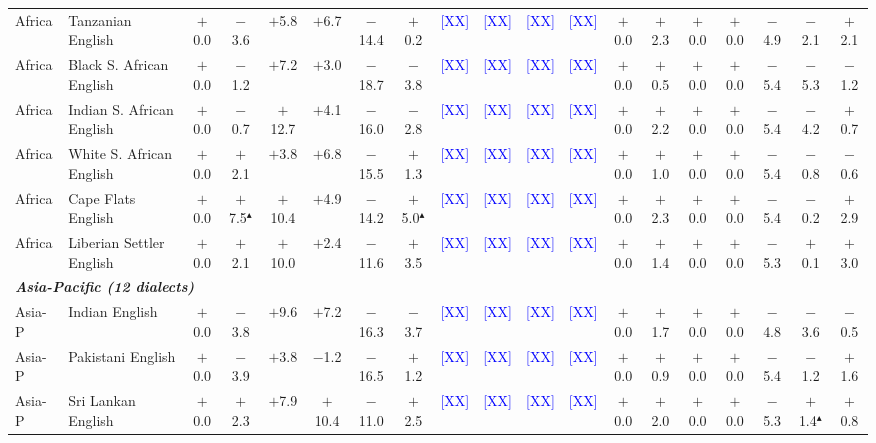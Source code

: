 \begin{table}[t]
\begin{tabular}{llccccccccccccccccc}
Africa & Tanzanian English & $+$0.0 & $-$3.6 & $+$5.8 & $+$6.7 & $-$14.4 & $+$0.2 & \textcolor{blue}{[XX]} & \textcolor{blue}{[XX]} & \textcolor{blue}{[XX]} & \textcolor{blue}{[XX]} & $+$0.0 & $+$2.3 & $+$0.0 & $+$0.0 & $-$4.9 & $-$2.1 & $+$2.1 \\
Africa & Black S. African English & $+$0.0 & $-$1.2 & $+$7.2 & $+$3.0 & $-$18.7 & $-$3.8 & \textcolor{blue}{[XX]} & \textcolor{blue}{[XX]} & \textcolor{blue}{[XX]} & \textcolor{blue}{[XX]} & $+$0.0 & $+$0.5 & $+$0.0 & $+$0.0 & $-$5.4 & $-$5.3 & $-$1.2 \\
Africa & Indian S. African English & $+$0.0 & $-$0.7 & $+$12.7 & $+$4.1 & $-$16.0 & $-$2.8 & \textcolor{blue}{[XX]} & \textcolor{blue}{[XX]} & \textcolor{blue}{[XX]} & \textcolor{blue}{[XX]} & $+$0.0 & $+$2.2 & $+$0.0 & $+$0.0 & $-$5.4 & $-$4.2 & $+$0.7 \\
Africa & White S. African English & $+$0.0 & $+$2.1 & $+$3.8 & $+$6.8 & $-$15.5 & $+$1.3 & \textcolor{blue}{[XX]} & \textcolor{blue}{[XX]} & \textcolor{blue}{[XX]} & \textcolor{blue}{[XX]} & $+$0.0 & $+$1.0 & $+$0.0 & $+$0.0 & $-$5.4 & $-$0.8 & $-$0.6 \\
Africa & Cape Flats English & $+$0.0 & $+$7.5$^\blacktriangle$ & $+$10.4 & $+$4.9 & $-$14.2 & $+$5.0$^\blacktriangle$ & \textcolor{blue}{[XX]} & \textcolor{blue}{[XX]} & \textcolor{blue}{[XX]} & \textcolor{blue}{[XX]} & $+$0.0 & $+$2.3 & $+$0.0 & $+$0.0 & $-$5.4 & $-$0.2 & $+$2.9 \\
Africa & Liberian Settler English & $+$0.0 & $+$2.1 & $+$10.0 & $+$2.4 & $-$11.6 & $+$3.5 & \textcolor{blue}{[XX]} & \textcolor{blue}{[XX]} & \textcolor{blue}{[XX]} & \textcolor{blue}{[XX]} & $+$0.0 & $+$1.4 & $+$0.0 & $+$0.0 & $-$5.3 & $+$0.1 & $+$3.0 \\
\midrule
\multicolumn{19}{l}{\textit{\textbf{Asia-Pacific (12 dialects)}}} \\
Asia-P & Indian English & $+$0.0 & $-$3.8 & $+$9.6 & $+$7.2 & $-$16.3 & $-$3.7 & \textcolor{blue}{[XX]} & \textcolor{blue}{[XX]} & \textcolor{blue}{[XX]} & \textcolor{blue}{[XX]} & $+$0.0 & $+$1.7 & $+$0.0 & $+$0.0 & $-$4.8 & $-$3.6 & $-$0.5 \\
Asia-P & Pakistani English & $+$0.0 & $-$3.9 & $+$3.8 & $-$1.2 & $-$16.5 & $+$1.2 & \textcolor{blue}{[XX]} & \textcolor{blue}{[XX]} & \textcolor{blue}{[XX]} & \textcolor{blue}{[XX]} & $+$0.0 & $+$0.9 & $+$0.0 & $+$0.0 & $-$5.4 & $-$1.2 & $+$1.6 \\
Asia-P & Sri Lankan English & $+$0.0 & $+$2.3 & $+$7.9 & $+$10.4 & $-$11.0 & $+$2.5 & \textcolor{blue}{[XX]} & \textcolor{blue}{[XX]} & \textcolor{blue}{[XX]} & \textcolor{blue}{[XX]} & $+$0.0 & $+$2.0 & $+$0.0 & $+$0.0 & $-$5.3 & $+$1.4$^\blacktriangle$ & $+$0.8 \\

\end{tabular}
\end{table}
